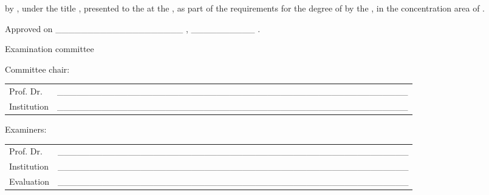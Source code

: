 
\begin{folhadeaprovacao}[\folhadeaprovacaoname]
{\imprimirtipotrabalho} by {\imprimirautor}, under the title \textbf{\imprimirtitulo}, presented to the {\imprimirescola} at the {\imprimiruniversidade}, as part of the requirements for the degree of {\imprimirtituloacademico} by the {\imprimirprograma}, in the concentration area of {\imprimirareadeconcentracao}.

\vspace{\hugeskipamount}
Approved on \_\_\_\_\_\_\_\_\_\_\_\_\_\_\_\_\_\_\_\_ , \_\_\_\_\_\_\_\_\_\_ .

\vspace{\hugeskipamount}
\begin{center}
  Examination committee
\end{center}

\vspace{\smallskipamount}
Committee chair:

\vspace{\tinyskipamount}
\begingroup


\setlength{\arrayrulewidth}{0pt}
\setlength{\tabcolsep}{0cm}
\begin{tabular}{m{2cm} P{14cm}}
  Prof. Dr. & \_\_\_\_\_\_\_\_\_\_\_\_\_\_\_\_\_\_\_\_\_\_\_\_\_\_\_\_\_\_\_\_\_\_\_\_\_\_\_\_\_\_\_\_\_\_\_\_\_\_\_\_\_\_\_ \\
  Institution & \_\_\_\_\_\_\_\_\_\_\_\_\_\_\_\_\_\_\_\_\_\_\_\_\_\_\_\_\_\_\_\_\_\_\_\_\_\_\_\_\_\_\_\_\_\_\_\_\_\_\_\_\_\_\_ \\
\end{tabular}

\vspace{\bigskipamount}
Examiners:

\vspace{\tinyskipamount}
\begin{tabular}{m{2cm} P{14cm}}
  Prof. Dr. & \_\_\_\_\_\_\_\_\_\_\_\_\_\_\_\_\_\_\_\_\_\_\_\_\_\_\_\_\_\_\_\_\_\_\_\_\_\_\_\_\_\_\_\_\_\_\_\_\_\_\_\_\_\_\_ \\
  Institution & \_\_\_\_\_\_\_\_\_\_\_\_\_\_\_\_\_\_\_\_\_\_\_\_\_\_\_\_\_\_\_\_\_\_\_\_\_\_\_\_\_\_\_\_\_\_\_\_\_\_\_\_\_\_\_ \\
  Evaluation & \_\_\_\_\_\_\_\_\_\_\_\_\_\_\_\_\_\_\_\_\_\_\_\_\_\_\_\_\_\_\_\_\_\_\_\_\_\_\_\_\_\_\_\_\_\_\_\_\_\_\_\_\_\_\_ \\
\end{tabular}


\end{folhadeaprovacao}
